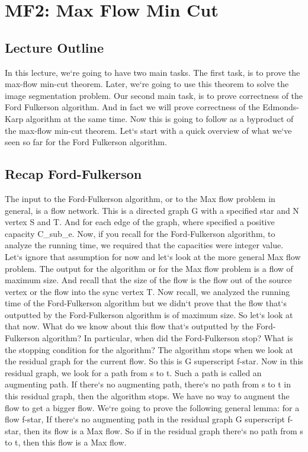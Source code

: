 \section{MF2: Max Flow Min Cut}

\subsection{Lecture Outline}
In this lecture, we`re going to have two main tasks.
The first task, is to prove the max-flow min-cut theorem.
Later, we`re going to use this theorem to solve the image segmentation problem.
Our second main task, is to prove correctness of the Ford Fulkerson algorithm.
And in fact we will prove correctness of the Edmonds-Karp algorithm at the same time.
Now this is going to follow as a byproduct of the max-flow min-cut theorem.
Let`s start with a quick overview of what we`ve seen so far for the Ford Fulkerson algorithm.

\subsection{Recap  Ford-Fulkerson}
The input to the Ford-Fulkerson algorithm, or to the Max flow problem in general, is a flow network.
This is a directed graph G with a specified star and N vertex S and T\@.
And for each edge of the graph, where specified a positive capacity C\_sub\_e.
Now, if you recall for the Ford-Fulkerson algorithm, to analyze the running time, we required that the capacities were integer value.
Let`s ignore that assumption for now and let`s look at the more general Max flow problem.
The output for the algorithm or for the Max flow problem is a flow of maximum size.
And recall that the size of the flow is the flow out of the source vertex or the flow into the sync vertex T\@.
Now recall, we analyzed the running time of the Ford-Fulkerson algorithm but we didn`t prove that the flow that`s outputted by the Ford-Fulkerson algorithm is of maximum size.
So let`s look at that now.
What do we know about this flow that`s outputted by the Ford-Fulkerson algorithm? In particular, when did the Ford-Fulkerson stop? What is the stopping condition for the algorithm? The algorithm stops when we look at the residual graph for the current flow.
So this is G superscript f-star.
Now in this residual graph, we look for a path from s to t.
Such a path is called an augmenting path.
If there`s no augmenting path, there`s no path from s to t in this residual graph, then the algorithm stops.
We have no way to augment the flow to get a bigger flow.
We`re going to prove the following general lemma: for a flow f-star, If there`s no augmenting path in the residual graph G superscript f-star, then its flow is a Max flow.
So if in the residual graph there`s no path from s to t, then this flow is a Max flow.

